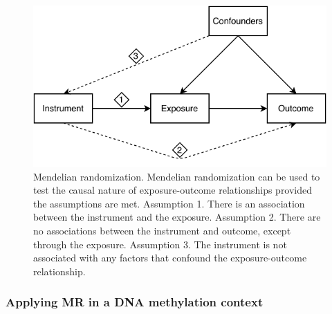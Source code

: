\documentclass[11pt,twoside]{bristolthesis}
\begin{document}
\begin{figure}
\centering
\includegraphics{figure/01-introduction/mr-diagram.pdf}
\caption{\label{fig:mr-diagram}Mendelian randomization. Mendelian randomization can be used to test the causal nature of exposure-outcome relationships provided the assumptions are met. Assumption 1. There is an association between the instrument and the exposure. Assumption 2. There are no associations between the instrument and outcome, except through the exposure. Assumption 3. The instrument is not associated with any factors that confound the exposure-outcome relationship.}
\end{figure}
\hypertarget{applying-mr-in-a-dna-methylation-context}{%
\subsubsection{Applying MR in a DNA methylation context}\label{applying-mr-in-a-dna-methylation-context}}
\end{document}
